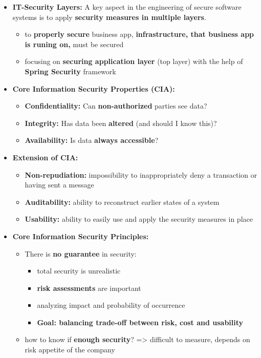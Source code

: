 \documentclass[ieeetran]{article}
\begin{document}
\begin{itemize}
\item \textbf{IT-Security Layers:} A key aspect in the engineering of secure software systems is to apply \textbf{security measures in multiple layers}.
	\begin{itemize}
	  \item to \textbf{properly secure} business app, \textbf{infrastructure, that business app is runing on,} must be secured

	\item focusing on \textbf{securing application layer} (top layer) with the help of \textbf{Spring Security} framework
	\end{itemize}

\item \textbf{Core Information Security Properties (CIA):}
	\begin{itemize}
	  \item \textbf{Confidentiality:} Can \textbf{non-authorized} parties see data?
	\item \textbf{Integrity:} Has data been \textbf{altered} (and should I know this)?
	\item \textbf{Availability:} Is data \textbf{always accessible}?
	\end{itemize}

\item \textbf{Extension of CIA:}
	\begin{itemize}
	  \item \textbf{Non-repudiation:} impossibility to inappropriately deny a transaction or having sent a message
	\item \textbf{Auditability:} ability to reconstruct earlier states of a system
	\item \textbf{Usability:} ability to easily use and apply the security measures in place
	\end{itemize}

	\pagebreak
\item \textbf{Core Information Security Principles:}
	\begin{itemize}
	  \item There is \textbf{no guarantee} in security:
		  \begin{itemize}
		    \item total security is unrealistic
		\item \textbf{risk assessments} are important
		\item analyzing impact and probability of occurrence
		\item \textbf{Goal: balancing trade-off between risk, cost and usability}
		  \end{itemize}

	\item how to know if \textbf{enough security}? => difficult to measure, depends on risk appetite of the company
	\end{itemize}
\end{itemize}
\end{document}
